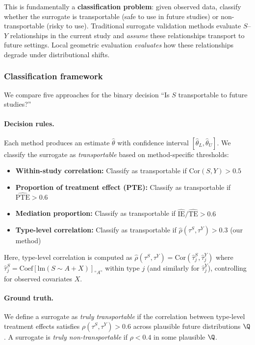 This is fundamentally a \textbf{classification problem}: given observed data, classify whether the surrogate is transportable (safe to use in future studies) or non-transportable (risky to use). Traditional surrogate validation methods evaluate $S$--$Y$ relationships in the current study and \emph{assume} these relationships transport to future settings. Local geometric evaluation \emph{evaluates} how these relationships degrade under distributional shifts.

\subsubsection{Classification framework}

We compare five approaches for the binary decision ``Is $S$ transportable to future studies?''

\paragraph{Decision rules.} Each method produces an estimate $\hat{\theta}$ with confidence interval $[\hat{\theta}_L, \hat{\theta}_U]$. We classify the surrogate as \emph{transportable} based on method-specific thresholds:

\begin{itemize}
    \item \textbf{Within-study correlation:} Classify as transportable if $\text{Cor}(S, Y) > 0.5$
    \item \textbf{Proportion of treatment effect (PTE):} Classify as transportable if $\widehat{\text{PTE}} > 0.6$
    \item \textbf{Mediation proportion:} Classify as transportable if $\widehat{\text{IE}} / \widehat{\text{TE}} > 0.6$
    \item \textbf{Type-level correlation:} Classify as transportable if $\widehat{\rho}(\tau^S, \tau^Y) > 0.3$ (our method)
\end{itemize}

Here, type-level correlation is computed as $\widehat{\rho}(\tau^S, \tau^Y) = \text{Cor}(\hat{\tau}_j^S, \hat{\tau}_j^Y)$ where $\hat{\tau}_j^S = \text{Coef}[\text{lm}(S \sim A + X)]_{\text{``}A\text{''}}$ within type $j$ (and similarly for $\hat{\tau}_j^Y$), controlling for observed covariates $X$.

\paragraph{Ground truth.} We define a surrogate as \emph{truly transportable} if the correlation between type-level treatment effects satisfies $\rho(\tau^S, \tau^Y) > 0.6$ across plausible future distributions $\Q$. A surrogate is \emph{truly non-transportable} if $\rho < 0.4$ in some plausible $\Q$.

